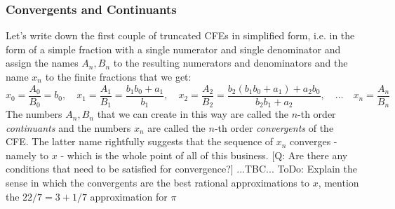 \subsubsection{Convergents and Continuants}
Let's write down the first couple of truncated CFEs in simplified form, i.e. in the form of a simple fraction with a single numerator and single denominator and assign the names $A_n, B_n$ to the resulting numerators and denominators and the name $x_n$ to the finite fractions that we get:
\begin{equation}
\label{Eq:ContinuantsAndConvergents}
x_0 = \frac{A_0}{B_0} = b_0, \quad
x_1 = \frac{A_1}{B_1} = \frac{b_1 b_0 + a_1}{b_1}, \quad
x_2 = \frac{A_2}{B_2} = \frac{b_2(b_1 b_0 + a_1) + a_2 b_0}{b_2 b_1 + a_2}, \quad
\ldots \quad
x_n = \frac{A_n}{B_n}
\end{equation}
The numbers $A_n, B_n$ that we can create in this way are called the $n$-th order \emph{continuants} and the numbers $x_n$ are called the $n$-th order \emph{convergents} of the CFE. The latter name rightfully suggests that the sequence of $x_n$ converges - namely to $x$ - which is the whole point of all of this business. [Q: Are there any conditions that need to be satisfied for convergence?] ...TBC... ToDo: Explain the sense in which the convergents are the best rational approximations to $x$, mention the $22/7 = 3 + 
1/7$ approximation for $\pi$






